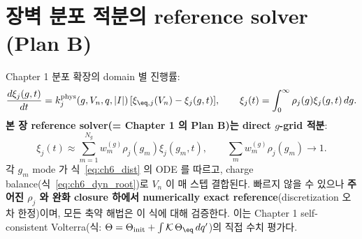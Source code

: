 \section{장벽 분포 적분의 reference solver (Plan B)}\label{sec:ch6_grid}
Chapter 1 분포 확장의 domain 별 진행률:
\begin{equation}
\frac{d\xi_j(g,t)}{dt}=k_j^{\mathrm{phys}}(g,V_n,q,|I|)\,[\xi_{\eq,j}(V_n)-\xi_j(g,t)],\qquad
\xi_j(t)=\int_0^\infty\rho_j(g)\xi_j(g,t)\,dg.
\label{eq:ch6_dist}
\end{equation}
\textbf{본 장 reference solver(= Chapter 1 의 Plan B)는 direct $g$-grid 적분}:
\begin{equation}
\xi_j(t)\approx\sum_{m=1}^{N_g}w_m^{(g)}\rho_j(g_m)\xi_j(g_m,t),\qquad \sum_m w_m^{(g)}\rho_j(g_m)\to1.
\label{eq:ch6_grid}
\end{equation}
각 $g_m$ mode 가 식~\eqref{eq:ch6_dist} 의 ODE 를 따르고, charge balance(식~\eqref{eq:ch6_dyn_root})로
$V_n$ 이 매 스텝 결합된다. 빠르지 않을 수 있으나 \textbf{주어진 $\rho_j$ 와 완화 closure 하에서 numerically
exact reference}(discretization 오차 한정)이며, 모든 축약 해법은 이 식에 대해 검증한다. 이는 Chapter 1
self-consistent Volterra(식: $\Theta=\Theta_{\mathrm{init}}+\int\mathcal K\,\Theta_{\eq}\,dq'$)의 직접 수치 평가다.

